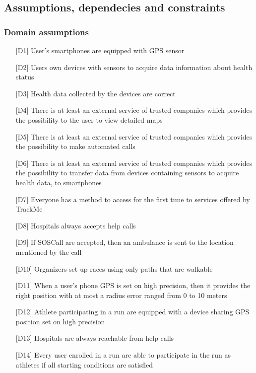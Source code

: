 \subsection{Assumptions, dependecies and constraints}

\subsubsection{Domain assumptions}
\begin{itemize}
\item[{[D1]}] User's smartphones are equipped with GPS sensor
\item[{[D2]}] Users own devices with sensors to acquire data information about health status
\item[{[D3]}] Health data collected by the devices are correct
\item[{[D4]}] There is at least an external service of trusted companies which provides the possibility to the user to view detailed maps
\item[{[D5]}] There is at least an external service of trusted companies which provides the possibility to make automated calls
\item[{[D6]}] There is at least an external service of trusted companies which provides the possibility to transfer data from devices containing sensors to acquire health data, to smartphones
\item[{[D7]}] Everyone has a method to access for the first time to services offered by TrackMe
\item[{[D8]}] Hospitals always accepts help calls
\item[{[D9]}] If SOSCall are accepted, then an ambulance is sent to the location mentioned by the call
\item[{[D10]}] Organizers set up races using only paths that are walkable
\item[{[D11]}] When a user's phone GPS is set on high precision, then it provides the right position with at most a radius error ranged from 0 to 10 meters
\item[{[D12]}] Athlete participating in a run are equipped with a device sharing GPS position set on high precision
\item[{[D13]}] Hospitals are always reachable from help calls
\item[{[D14]}] Every user enrolled in a run are able to participate in the run as athletes if all starting conditions are satisfied
\end{itemize}
